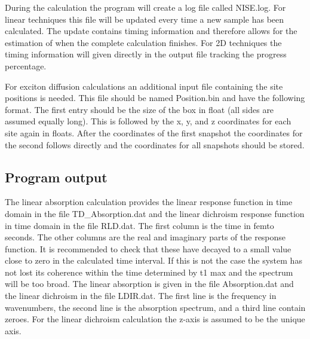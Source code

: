 During the calculation the program will create a log file called NISE.log. For linear techniques this file will be updated every time a new sample has been calculated. The update contains timing information and
therefore allows for the estimation of when the complete calculation finishes. For 2D techniques the timing information will given directly in the output file tracking the progress percentage.

For exciton diffusion calculations an additional input file containing the site positions is needed.
This file should be named Position.bin and have the following format. The first entry should be the
size of the box in float (all sides are assumed equally long). This is followed by the x, y, and z coordinates for each site again in floats. After the coordinates of the first snapshot the coordinates
for the second follows directly and the coordinates for all snapshots should be stored.


\subsection{Program output}
The linear absorption calculation provides the linear response function in time domain in the file TD\_Absorption.dat 
and the linear dichroism response function in time domain in the file RLD.dat. The first 
column is the time in femto seconds. The other columns are the real and imaginary parts 
of the response function. It is recommended to check that these have decayed to a small 
value close to zero in the calculated time interval. If this is not the case the system has 
not lost its coherence within the time determined by t1 max and the spectrum will be 
too broad. The linear absorption is given in the file Absorption.dat and the linear dichroism in 
the file LDIR.dat. The first line is the frequency in wavenumbers, the second line is the 
absorption spectrum, and a third line contain zeroes. For the linear dichroism calculation 
the z-axis is assumed to be the unique axis. 


